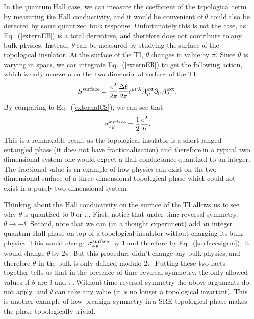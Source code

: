 In the quantum Hall case, we can measure the coefficient of the topological term by measuring the Hall conductivity, and it would be convenient of $\theta$ could also be detected by some quantized bulk response. Unfortunately this is not the case, as Eq.~(\ref{externEB}) is a total derivative, and therefore does not contribute to any bulk physics. Instead, $\theta$ can be measured by studying the surface of the topological insulator. At the surface of the TI, $\theta$ changes in value by $\pi$. Since $\theta$ is varying in space, we can integrate Eq.~(\ref{externEB}) to get the following action, which is only non-zero on the two dimensional surface of the TI:
\begin{equation}
S^{\rm surface}=\frac{e^2}{2\pi}\frac{\Delta\theta}{2\pi} \epsilon^{\mu\nu\lambda} A^{\rm ext}_\mu \partial_\nu A^{\rm ext}_\lambda.
\label{TIsurface}
\end{equation}
By comparing to Eq.~(\ref{externalCS}), we can see that 
\begin{equation}
\sigma_{xy}^{\rm surface}=\frac12\frac{e^2}{h}.
\label{surfacesigma}
\end{equation}
This is a remarkable result as the topological insulator is a short ranged entangled phase (it does not have fractionalization) and therefore in a typical two dimensional system one would expect a Hall conductance quantized to an integer. The fractional value is an example of how physics can exist on the two dimensional surface of a three dimensional topological phase which could not exist in a purely two dimensional system.

	Thinking about the Hall conductivity on the surface of the TI allows us to see why $\theta$ is quantized to $0$ or $\pi$. First, notice that under time-reversal symmetry, $\theta\rightarrow-\theta$. Second, note that we can (in a thought experiment) add an integer quantum Hall phase on top of a topological insulator without changing its bulk physics. This would change $\sigma_{xy}^{\rm surface}$ by $1$ and therefore by Eq.~(\ref{surfacesigma}), it would change $\theta$ by $2\pi$. But this procedure didn't change any bulk physics, and therefore $\theta$ in the bulk is only defined modulo $2\pi$. Putting these two facts together tells us that in the presence of time-reversal symmetry, the only allowed values of $\theta$ are $0$ and $\pi$. Without time-reversal symmetry the above arguments do not apply, and $\theta$ can take any value (it is no longer a topological invariant). This is another example of how breakign symmetry in a SRE topological phase makes the phase topologically trivial.

